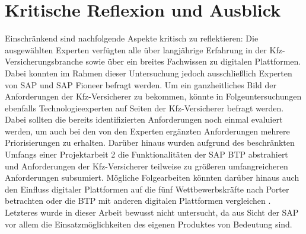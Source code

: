 \section{Kritische Reflexion und Ausblick}
Einschränkend sind nachfolgende Aspekte kritisch zu reflektieren: Die ausgewählten Experten verfügten alle über langjährige Erfahrung in der Kfz-Versicherungsbranche sowie über ein breites Fachwissen zu digitalen Plattformen. Dabei konnten im Rahmen dieser Untersuchung jedoch ausschließlich Experten von SAP und SAP Fioneer befragt werden. Um ein ganzheitliches Bild der Anforderungen der Kfz-Versicherer zu bekommen, könnte in Folgeuntersuchungen ebenfalls Technologieexperten auf Seiten der Kfz-Versicherer befragt werden. Dabei sollten die bereits identifizierten Anforderungen noch einmal evaluiert werden, um auch bei den von den Experten ergänzten Anforderungen mehrere Priorisierungen zu erhalten. Darüber hinaus wurden aufgrund des beschränkten Umfangs einer Projektarbeit 2 die Funktionalitäten der SAP BTP abstrahiert und Anforderungen der Kfz-Versicherer teilweise zu größeren umfangreicheren Anforderungen subsumiert. Mögliche Folgearbeiten könnten darüber hinaus auch den Einfluss digitaler Plattformen auf die fünf Wettbewerbskräfte nach Porter betrachten oder die BTP mit anderen digitalen Plattformen vergleichen . Letzteres wurde in dieser Arbeit bewusst nicht untersucht, da aus Sicht der SAP vor allem die Einsatzmöglichkeiten des eigenen Produktes von Bedeutung sind.

